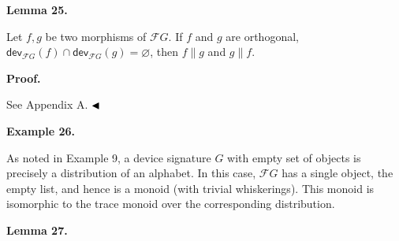  
 
\par\medskip\noindent\textbf{Lemma 25.}\par
 
 
Let $f,g$ be two morphisms of $\mathcal{F}G$. If $f$ and $g$ are orthogonal, $\mathsf{dev}_{\mathcal{F}G}(f)\cap\mathsf{dev}_{\mathcal{F}G}(g)=\varnothing$, then $f\parallel g$ and $g\parallel f$.\par
 
 
 
 
\par\medskip\noindent\textbf{Proof.}\par
 
 
See Appendix A. $\hfill\blacktriangleleft$\par
 
 
 
\par\medskip\noindent\textbf{Example 26.}\par
 
 
As noted in Example 9, a device signature $G$ with empty set of objects is precisely a distribution of an alphabet. In this case, $\mathcal{F}G$ has a single object, the empty list, and hence is a monoid (with trivial whiskerings). This monoid is isomorphic to the trace monoid over the corresponding distribution.\par
 
 
 
 
\par\medskip\noindent\textbf{Lemma 27.}\par
 
 
